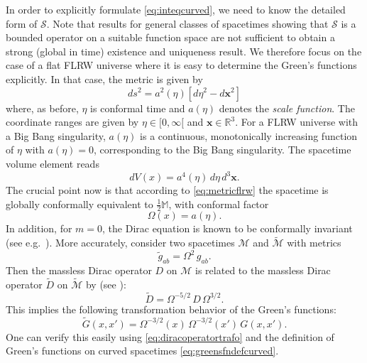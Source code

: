 \documentclass[b5paper,draft,openbib,12pt]{memoir}
\newcommand{\R}{\mathbb{R}}
\newcommand{\M}{\mathbb{M}}
\newcommand{\vx}{\mathbf{x}}
\begin{document}
In order to explicitly formulate \eqref{eq:inteqcurved}, we need 
to know the detailed form of $\mathscr{S}$. Note that results for 
general classes of spacetimes showing that $\mathscr{S}$ is a bounded 
operator on a suitable function space are not sufficient to obtain 
a strong (global in time) existence and uniqueness result. We 
therefore focus on the case of a flat FLRW universe where it is 
easy to determine the Green's functions explicitly. In that case, 
the metric is given by
\begin{equation}
	ds^2 = a^2(\eta) [d \eta^2 - d \vx^2]
	\label{eq:metricflrw}
\end{equation}
where, as before, $\eta$ is conformal time and $a(\eta)$ denotes the 
\textit{scale function}. The coordinate ranges are given 
by $\eta \in [0,\infty[$ and $\vx \in \R^3$. For a FLRW universe 
with a Big Bang singularity, $a(\eta)$ is a continuous, 
monotonically increasing function of $\eta$ with $a(\eta)=0$, 
corresponding to the Big Bang singularity. The spacetime volume 
element reads
\begin{equation}
	dV(x) = a^4(\eta) \, d \eta\, d^3 \vx.
\end{equation}
The crucial point now is that according to \eqref{eq:metricflrw} 
the spacetime is globally conformally equivalent to $\frac{1}{2}\M$, 
with conformal factor
\begin{equation}
	\Omega(x) = a(\eta).
\end{equation}
In addition, for $m=0$, the Dirac equation is known to be 
conformally invariant (see e.g.\ \cite{silenko2015new,penrose_rindler}). More 
accurately, consider two spacetimes $\mathcal{M}$ and 
$\widetilde{\mathcal{M}}$ with metrics
\begin{equation}
	\widetilde{g}_{ab} = \Omega^2 \, g_{ab}.
\end{equation}
Then the massless Dirac operator $D$ on $\mathcal{M}$ is related to 
the massless Dirac operator $\widetilde{D}$ on 
$\widetilde{\mathcal{M}}$ by (see 
\cite{silenko2015new,fecko2006differential}):
\begin{equation}
	\widetilde{D} = \Omega^{-5/2} \, D \, \Omega^{3/2}.
	\label{eq:diracoperatortrafo}
\end{equation}
This implies the following transformation behavior of the Green's 
functions:
\begin{equation}
	\widetilde{G}(x,x') = \Omega^{-3/2}(x) \,\Omega^{-3/2}(x') \, G(x,x').
\end{equation}
One can verify this easily using \eqref{eq:diracoperatortrafo} and 
the definition of Green's functions on curved spacetimes 
\eqref{eq:greensfndefcurved}.
\end{document}
